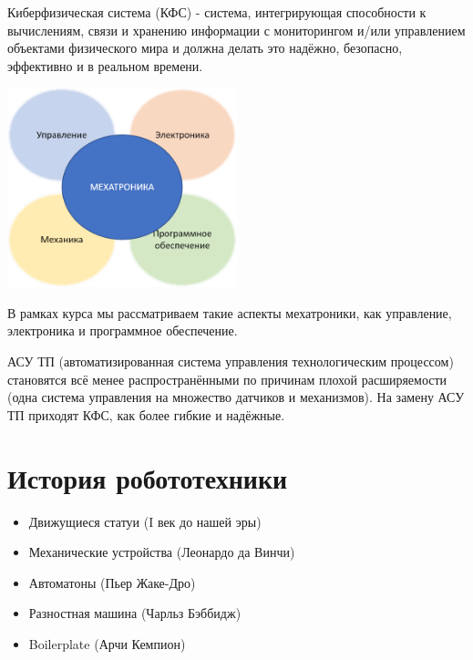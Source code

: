 \documentclass[12pt]{article}
\begin{document}
\begin{sloppypar}
    Киберфизическая система (КФС) - система, интегрирующая способности к вычислениям,
    связи и хранению информации с мониторингом и/или управлением объектами
    физического мира и должна делать это надёжно, безопасно, эффективно и в
    реальном времени.

    \includegraphics[width=0.5\textwidth]{graphics/Мехатроника.png}

    В рамках курса мы рассматриваем такие аспекты мехатроники, как управление, электроника и программное обеспечение.

    АСУ ТП (автоматизированная система управления технологическим процессом)
    становятся всё менее распространёнными по причинам плохой
    расширяемости (одна система управления на множество датчиков и механизмов).
    На замену АСУ ТП приходят КФС, как более гибкие и надёжные.

    \section{История робототехники}
    \begin{itemize}
        \item Движущиеся статуи (I век до нашей эры)
        \item Механические устройства (Леонардо да Винчи)
        \item Автоматоны (Пьер Жаке-Дро)
        \item Разностная машина (Чарльз Бэббидж)
        \item Boilerplate (Арчи Кемпион)
    \end{itemize}


\end{sloppypar}
\end{document}
